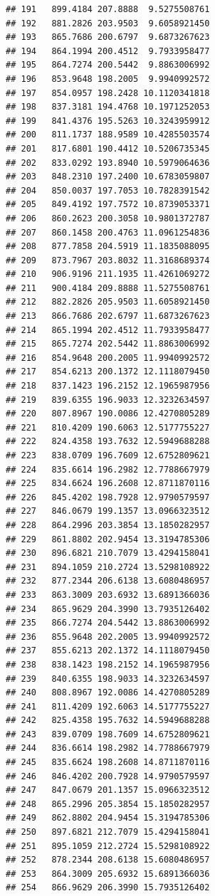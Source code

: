 \documentclass[
]{article}
\begin{document}
\begin{verbatim}
## 191   899.4184 207.8888  9.5275508761
## 192   881.2826 203.9503  9.6058921450
## 193   865.7686 200.6797  9.6873267623
## 194   864.1994 200.4512  9.7933958477
## 195   864.7274 200.5442  9.8863006992
## 196   853.9648 198.2005  9.9940992572
## 197   854.0957 198.2428 10.1120341818
## 198   837.3181 194.4768 10.1971252053
## 199   841.4376 195.5263 10.3243959912
## 200   811.1737 188.9589 10.4285503574
## 201   817.6801 190.4412 10.5206735345
## 202   833.0292 193.8940 10.5979064636
## 203   848.2310 197.2400 10.6783059807
## 204   850.0037 197.7053 10.7828391542
## 205   849.4192 197.7572 10.8739053371
## 206   860.2623 200.3058 10.9801372787
## 207   860.1458 200.4763 11.0961254836
## 208   877.7858 204.5919 11.1835088095
## 209   873.7967 203.8032 11.3168689374
## 210   906.9196 211.1935 11.4261069272
## 211   900.4184 209.8888 11.5275508761
## 212   882.2826 205.9503 11.6058921450
## 213   866.7686 202.6797 11.6873267623
## 214   865.1994 202.4512 11.7933958477
## 215   865.7274 202.5442 11.8863006992
## 216   854.9648 200.2005 11.9940992572
## 217   854.6213 200.1372 12.1118079450
## 218   837.1423 196.2152 12.1965987956
## 219   839.6355 196.9033 12.3232634597
## 220   807.8967 190.0086 12.4270805289
## 221   810.4209 190.6063 12.5177755227
## 222   824.4358 193.7632 12.5949688288
## 223   838.0709 196.7609 12.6752809621
## 224   835.6614 196.2982 12.7788667979
## 225   834.6624 196.2608 12.8711870116
## 226   845.4202 198.7928 12.9790579597
## 227   846.0679 199.1357 13.0966323512
## 228   864.2996 203.3854 13.1850282957
## 229   861.8802 202.9454 13.3194785306
## 230   896.6821 210.7079 13.4294158041
## 231   894.1059 210.2724 13.5298108922
## 232   877.2344 206.6138 13.6080486957
## 233   863.3009 203.6932 13.6891366036
## 234   865.9629 204.3990 13.7935126402
## 235   866.7274 204.5442 13.8863006992
## 236   855.9648 202.2005 13.9940992572
## 237   855.6213 202.1372 14.1118079450
## 238   838.1423 198.2152 14.1965987956
## 239   840.6355 198.9033 14.3232634597
## 240   808.8967 192.0086 14.4270805289
## 241   811.4209 192.6063 14.5177755227
## 242   825.4358 195.7632 14.5949688288
## 243   839.0709 198.7609 14.6752809621
## 244   836.6614 198.2982 14.7788667979
## 245   835.6624 198.2608 14.8711870116
## 246   846.4202 200.7928 14.9790579597
## 247   847.0679 201.1357 15.0966323512
## 248   865.2996 205.3854 15.1850282957
## 249   862.8802 204.9454 15.3194785306
## 250   897.6821 212.7079 15.4294158041
## 251   895.1059 212.2724 15.5298108922
## 252   878.2344 208.6138 15.6080486957
## 253   864.3009 205.6932 15.6891366036
## 254   866.9629 206.3990 15.7935126402

\end{verbatim}
\end{document}
